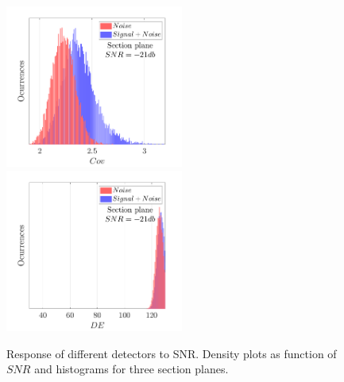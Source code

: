 \documentclass[lettersize,journal]{IEEEtran}
\begin{document}
\begin{figure}
    \includegraphics[width = 2.3in]{histCov-21db.png}
    \includegraphics[width = 2.3in]{histE-21db.png}
    \caption{Response of different detectors to SNR. Density plots as function of $SNR$ and histograms for three section planes.}
    \label{fig_max}
\end{figure} 

\end{document}
